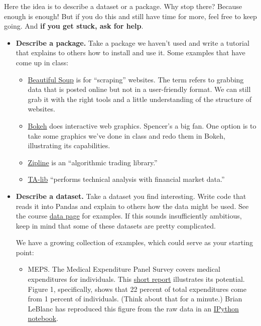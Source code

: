 \documentclass[11pt]{article}
\begin{document}
Here the idea is to describe a dataset or a package.
Why stop there?  Because enough is enough!  But if you do this and still have time
for more, feel free to keep going. 
And {\bf if you get stuck, ask for help}.     
\begin{itemize} 

\item {\bf Describe a package.\/}
Take a package we haven't used and write a tutorial that explains to others how to install
and use it.  Some examples that have come up in class:  

\begin{itemize} 
\item \href{http://www.crummy.com/software/BeautifulSoup/bs4/doc/}
{Beautiful Soup} is for ``scraping''  websites.  
The term refers to grabbing data that is posted online but not in a user-friendly format.
We can still grab it with the right tools and a little understanding of the structure
of websites.  

\item \href{http://bokeh.pydata.org/en/latest/docs/gallery.html}{Bokeh} does interactive web graphics.
Spencer's a big fan.
One option is to take some graphics we've done in class and redo them in Bokeh,
illustrating its capabilities.

\item \href{https://github.com/quantopian/zipline}{Zipline} is an 
``algorithmic trading library.''

\item \href{https://github.com/mrjbq7/ta-lib}{TA-lib} 
``performs technical analysis with financial market data.''
\end{itemize} 


\item {\bf Describe a dataset.\/}
Take a dataset you find interesting.  Write code that reads it into Pandas
and explain to others how the data might be used. 
See the course \href{}{data page}
for examples.
If this sounds insufficiently ambitious, keep in mind that some of these datasets 
are pretty complicated.  

We have a growing collection of examples, which could serve as your starting point:
\begin{itemize}
\item MEPS.  The Medical Expenditure Panel Survey covers medical expenditures for individuals.   
This \href{http://www.nihcm.org/pdf/DataBrief3 Final.pdf}{short report} illustrates its potential.
Figure 1, specifically, shows that 22 percent of total expenditures come
from 1 percent of individuals.  
(Think about that for a minute.) 
Brian LeBlanc has reproduced this figure from the raw data in an 
\href{https://github.com/DaveBackus/Data_Bootcamp/blob/master/Code/Lab/MEPS_data_experiment_Brian.ipynb}
{IPython notebook}.  


\end{itemize}
\end{itemize}
\end{document}
